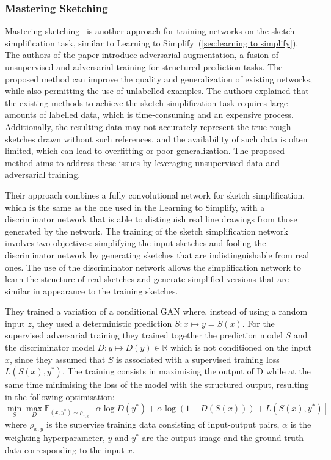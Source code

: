 \subsubsection{Mastering Sketching}
\label{sec:mastering sketching}
Mastering sketching~\cite{masteringSketching} is another approach for training networks on the sketch simplification task, similar to Learning to Simplify~(\ref{sec:learning to simplify}). 
The authors of the paper introduce adversarial augmentation, a fusion of unsupervised and adversarial training for structured prediction tasks. The proposed method can improve the quality and generalization of existing networks, while also permitting the use of unlabelled examples.
The authors explained that the existing methods to achieve the sketch simplification task requires large amounts of labelled data, which is time-consuming and an expensive process. Additionally, the resulting data may not accurately represent the true rough sketches drawn without such references, and the availability of such data is often limited, which can lead to overfitting or poor generalization. The proposed method aims to address these issues by leveraging unsupervised data and adversarial training.

\noindent Their approach combines a fully convolutional network for sketch simplification, which is the same as the one used in the Learning to Simplify, with a discriminator network that is able to distinguish real line drawings from those generated by the network. The training of the sketch simplification network involves two objectives: simplifying the input sketches and fooling the discriminator network by generating sketches that are indistinguishable from real ones.
The use of the discriminator network allows the simplification network to learn the structure of real sketches and generate simplified versions that are similar in appearance to the training sketches.

\noindent They trained a variation of a conditional GAN where, instead of using a random input $z$, they used a deterministic prediction $S: x \mapsto y = S(x)$. For the supervised adversarial training they trained together the prediction model $S$ and the discriminator model $D: y \mapsto D(y)\in \mathbb{R}$ which is not conditioned on the input $x$, since they assumed that $S$ is associated with a supervised training loss $L(S(x), y^*)$. The training consists in maximising the output of D while at the same time minimising the loss of the model with the structured output, resulting in the following optimisation:
\begin{equation}
    \label{eq:objective function supervised adv training}
    \min_S \max_D \mathbb{E}_{(x,y^*)\sim \rho_{x,y}}[\alpha\log D(y^*) + \alpha\log(1-D(S(x))) + L(S(x),y^*)]
\end{equation}
where $\rho_{x,y}$ is the supervise training data consisting of input-output pairs, $\alpha$ is the weighting hyperparameter, $y$ and $y^*$ are the output image and the ground truth data corresponding to the input $x$.

